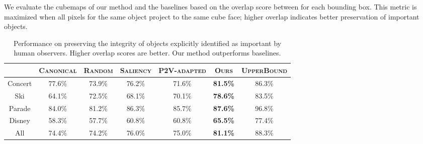 We evaluate the cubemaps of our method and the baselines based on the overlap score  between
for each bounding box.  This metric is maximized when all pixels for the same object project to the same cube face; higher overlap indicates better preservation of important objects.



\begin{table}[t]
\centering
{\footnotesize \begin{tabular}{ |c|c|c|c|c|c||c|}
\hline

 & \textsc{Canonical} & \textsc{Random} & \textsc{Saliency}& \textsc{P2V-adapted}& \textsc{Ours} & \textsc{UpperBound}    \\ \hline

Concert  & 77.6\% & 73.9\% & 76.2\% & 71.6\% & \textbf{81.5\%} & 86.3\% \\ \hline
Ski      & 64.1\% & 72.5\% & 68.1\% & 70.1\% & \textbf{78.6\%} & 83.5\% \\ \hline
Parade   & 84.0\% & 81.2\% & 86.3\% & 85.7\% & \textbf{87.6\%} & 96.8\% \\ \hline
Disney   & 58.3\% & 57.7\% & 60.8\% & 60.8\% & \textbf{65.5\%} & 77.4\% \\ \hline
All      & 74.4\% & 74.2\% & 76.0\% & 75.0\% & \textbf{81.1\%} & 88.3\% \\ \hline
\end{tabular}}
\vspace{4pt}
\caption{Performance on preserving the integrity of objects explicitly identified as important by human observers.  Higher overlap scores are better. Our method outperforms  baselines.} \vspace*{-0.2in}
\label{tab:imp_objects}

\vspace{-10pt}

\end{table}



